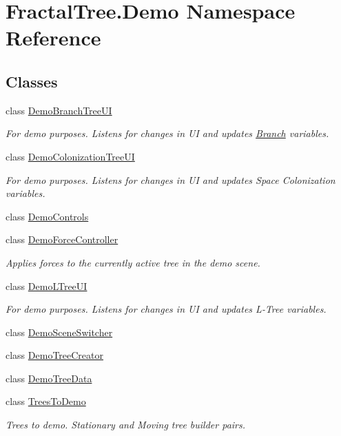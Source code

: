 \hypertarget{namespace_fractal_tree_1_1_demo}{}\section{Fractal\+Tree.\+Demo Namespace Reference}
\label{namespace_fractal_tree_1_1_demo}
\subsection*{Classes}
\begin{DoxyCompactItemize}
\item 
class \hyperlink{class_fractal_tree_1_1_demo_1_1_demo_branch_tree_u_i}{Demo\+Branch\+Tree\+UI}
\begin{DoxyCompactList}\small\item\em For demo purposes. Listens for changes in UI and updates \hyperlink{interface_fractal_tree_1_1_branch}{Branch} variables. \end{DoxyCompactList}\item 
class \hyperlink{class_fractal_tree_1_1_demo_1_1_demo_colonization_tree_u_i}{Demo\+Colonization\+Tree\+UI}
\begin{DoxyCompactList}\small\item\em For demo purposes. Listens for changes in UI and updates Space Colonization variables. \end{DoxyCompactList}\item 
class \hyperlink{class_fractal_tree_1_1_demo_1_1_demo_controls}{Demo\+Controls}
\item 
class \hyperlink{class_fractal_tree_1_1_demo_1_1_demo_force_controller}{Demo\+Force\+Controller}
\begin{DoxyCompactList}\small\item\em Applies forces to the currently active tree in the demo scene. \end{DoxyCompactList}\item 
class \hyperlink{class_fractal_tree_1_1_demo_1_1_demo_l_tree_u_i}{Demo\+L\+Tree\+UI}
\begin{DoxyCompactList}\small\item\em For demo purposes. Listens for changes in UI and updates L-\/\+Tree variables. \end{DoxyCompactList}\item 
class \hyperlink{class_fractal_tree_1_1_demo_1_1_demo_scene_switcher}{Demo\+Scene\+Switcher}
\item 
class \hyperlink{class_fractal_tree_1_1_demo_1_1_demo_tree_creator}{Demo\+Tree\+Creator}
\item 
class \hyperlink{class_fractal_tree_1_1_demo_1_1_demo_tree_data}{Demo\+Tree\+Data}
\item 
class \hyperlink{class_fractal_tree_1_1_demo_1_1_trees_to_demo}{Trees\+To\+Demo}
\begin{DoxyCompactList}\small\item\em Trees to demo. Stationary and Moving tree builder pairs. \end{DoxyCompactList}\end{DoxyCompactItemize}
